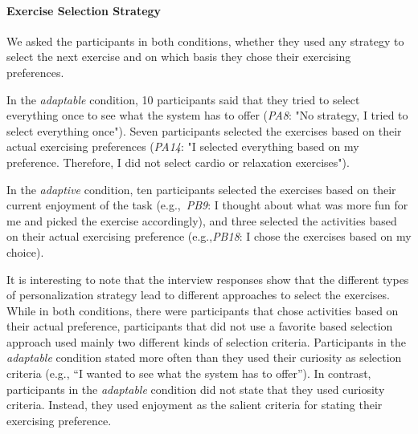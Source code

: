 \documentclass[twocolumn]{svjour3}          %
\begin{document}


\paragraph{Exercise Selection Strategy}
We asked the participants in both conditions, whether they used any strategy to select the next exercise and on which basis they chose their exercising preferences.

In the \textit{adaptable} condition, 10 participants said that they tried to select everything once to see what the system has to offer (\textit{PA8}: "No strategy, I tried to select everything once"). Seven participants selected the exercises based on their actual exercising preferences (\textit{PA14}: "I selected everything based on my preference. Therefore, I did not select cardio or relaxation exercises").

In the \textit{adaptive} condition, ten participants selected the exercises based on their current enjoyment of the task (e.g.,~\textit{PB9}: I thought about what was more fun for me and picked the exercise accordingly), and three selected the activities based on their actual exercising preference (e.g.,\textit{PB18}: I chose the exercises based on my choice).

It is interesting to note that the interview responses show that the different types of personalization strategy lead to different approaches to select the exercises. While in both conditions, there were participants that chose activities based on their actual preference, participants that did not use a favorite based selection approach used mainly two different kinds of selection criteria. Participants in the \textit{adaptable} condition stated more often than they used their curiosity as selection criteria (e.g., ``I wanted to see what the system has to offer''). In contrast, participants in the \textit{adaptable} condition did not state that they used curiosity criteria. Instead, they used enjoyment as the salient criteria for stating their exercising preference.
\end{document}
